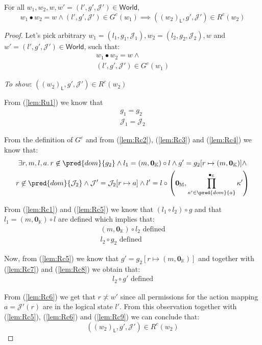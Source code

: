 \lem \label{lem:Rc}  For all $w_1, w_2, w, w' = (l', g', \mathcal{J}') \in \mathsf{World}$,
\[
	w_1 \bullet w_2 = w \land (l', g', \mathcal{J}') \in G^c(w_1) \implies ((w_2)_\mathsf{L}, g', \mathcal{J}') \in R^c(w_2)
\]

{\parindent0pt
\begin{proof}
Let's pick arbitrary $w_1 = (l_1, g_1, \mathcal{J}_1), w_2 = (l_2, g_2, \mathcal{J}_2), w$ and $w' = (l', g', \mathcal{J}') \in \mathsf{World}$, such that:
\begin{gather}
	\label{lem:Rc1} w_1 \bullet w_2 = w \land \\
	\label{lem:Rc2} (l', g', \mathcal{J}') \in G^c(w_1)
\end{gather}

\textit{To show}: $((w_2)_\mathsf{L}, g', \mathcal{J}') \in R^c(w_2)$

From (\ref{lem:Ru1}) we know that
\begin{gather}
	\label{lem:Rc3} g_1 = g_2 \\
	\label{lem:Rc4} \mathcal{J}_1 = \mathcal{J}_2
\end{gather}

From the definition of $G^c$ and from (\ref{lem:Rc2}), (\ref{lem:Rc3}) and (\ref{lem:Rc4}) we know that:
\begin{gather}
	\label{lem:Rc5} \exists r, m, l, a \ldotp r \not\in \pred{dom}{g_2} \land l_1 = (m, \mathbf{0}_\mathbb{K}) \circ l \land g' = g_2[r \mapsto (m, \mathbf{0}_\mathbb{K})] \land
	\\
	\label{lem:Rc6} r \not\in \pred{dom}{\mathcal{J}_2} \land \mathcal{J}' = \mathcal{J}_2[r \mapsto a] \land l' = l \circ \left( \mathbf{0}_\mathbb{M}, \prod^{\bullet_\mathbb{K}}_{\kappa' \in \pred{dom}{a}} \kappa' \right)
\end{gather}

From (\ref{lem:Rc1}) and (\ref{lem:Rc5}) we know that $(l_1 \circ l_2) \circ g$ and that $l_1 = (m, \mathbf{0}_\mathbb{K}) \circ l$ are defined which implies that:
\begin{gather}
	\label{lem:Rc7} (m, \mathbf{0}_\mathbb{K}) \circ l_2 \text{ defined}
	\\
	\label{lem:Rc8} l_2 \circ g_2 \text{ defined}
\end{gather}

Now, from (\ref{lem:Rc5}) we know that $g' = g_2[r \mapsto (m, \mathbf{0}_\mathbb{K})]$ and together with (\ref{lem:Rc7}) and (\ref{lem:Rc8}) we obtain that:
\begin{gather}
	\label{lem:Rc9} l_2 \circ g' \text{ defined}
\end{gather}

From (\ref{lem:Rc6}) we get that $r \not\asymp w'$ since all permissions for the action mapping $a = \mathcal{J}'(r)$ are in the logical state $l'$. From this observation together with (\ref{lem:Rc5}), (\ref{lem:Rc6}) and (\ref{lem:Rc9}) we can conclude that:
\[
	((w_2)_\mathsf{L}, g', \mathcal{J}') \in R^c(w_2)
\]
\end{proof}
}

